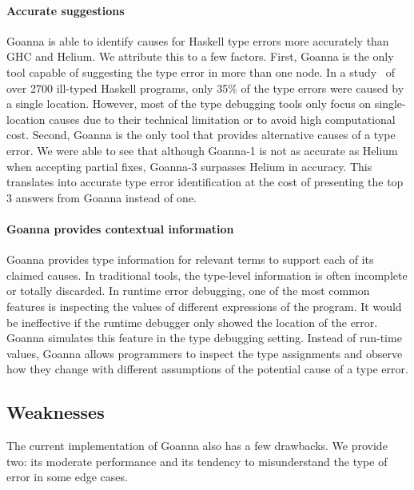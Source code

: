     \paragraph{\textbf{Accurate suggestions}} Goanna is able to identify causes for Haskell type errors more accurately than GHC and Helium. We attribute this to a few factors. First, Goanna is the only tool capable of suggesting the type error in more than one node. In a study~\cite{Wu2017-eb} of over 2700 ill-typed Haskell programs, only 35\% of the type errors were caused by a single location. However, most of the type debugging tools only focus on single-location causes due to their technical limitation or to avoid high computational cost. Second, Goanna is the only tool that provides alternative causes of a type error. We were able to see that although Goanna-1 is not as accurate as Helium when accepting partial fixes, Goanna-3 surpasses Helium in accuracy. This translates into accurate type error identification at the cost of presenting the top 3 answers from Goanna instead of one.
    

    \paragraph{\textbf{Goanna provides contextual information}}
    Goanna provides type information for relevant terms to support each of its claimed causes. In traditional tools, the type-level information is often incomplete or totally discarded. In runtime error debugging, one of the most common features is inspecting the values of different expressions of the program. It would be ineffective if the runtime debugger only showed the location of the error. Goanna simulates this feature in the type debugging setting. Instead of run-time values, Goanna allows programmers to inspect the type assignments and observe how they change with different assumptions of the potential cause of a type error. 

    \subsection{Weaknesses}

    The current implementation of Goanna also has a few drawbacks. We provide two: its moderate performance and its tendency to misunderstand the type of error in some edge cases. 
